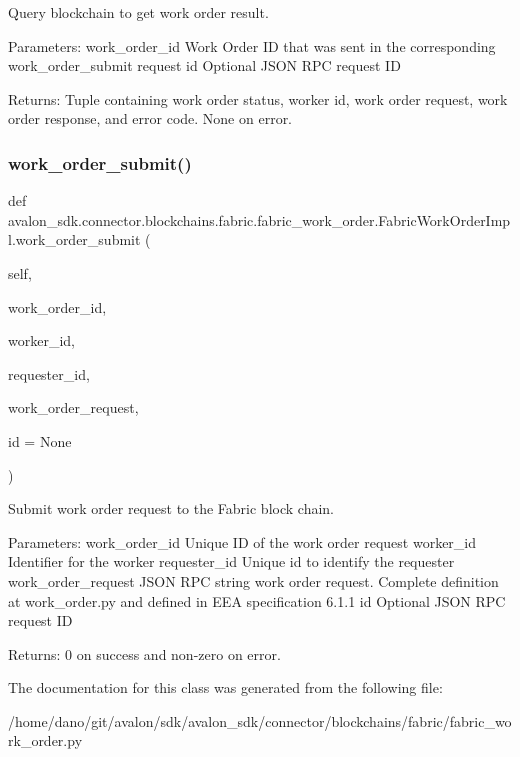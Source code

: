 \begin{DoxyVerb}Query blockchain to get work order result.

Parameters:
work_order_id Work Order ID that was sent in the
      corresponding work_order_submit request
id            Optional JSON RPC request ID

Returns:
Tuple containing work order status, worker id, work order request,
work order response, and error code.
None on error.
\end{DoxyVerb}
 \mbox{\label{classavalon__sdk_1_1connector_1_1blockchains_1_1fabric_1_1fabric__work__order_1_1FabricWorkOrderImpl_afa47ca30496161f6fe0c60481fd417ee}} 
\subsubsection{\texorpdfstring{work\+\_\+order\+\_\+submit()}{work\_order\_submit()}}
{\footnotesize\ttfamily def avalon\+\_\+sdk.\+connector.\+blockchains.\+fabric.\+fabric\+\_\+work\+\_\+order.\+Fabric\+Work\+Order\+Impl.\+work\+\_\+order\+\_\+submit (\begin{DoxyParamCaption}\item[{}]{self,  }\item[{}]{work\+\_\+order\+\_\+id,  }\item[{}]{worker\+\_\+id,  }\item[{}]{requester\+\_\+id,  }\item[{}]{work\+\_\+order\+\_\+request,  }\item[{}]{id = {\ttfamily None} }\end{DoxyParamCaption})}

\begin{DoxyVerb}Submit work order request to the Fabric block chain.

Parameters:
work_order_id      Unique ID of the work order request
worker_id          Identifier for the worker
requester_id       Unique id to identify the requester
work_order_request JSON RPC string work order request.
           Complete definition at work_order.py and
           defined in EEA specification 6.1.1
id                 Optional JSON RPC request ID

Returns:
0 on success and non-zero on error.
\end{DoxyVerb}
 

The documentation for this class was generated from the following file\+:\begin{DoxyCompactItemize}
\item 
/home/dano/git/avalon/sdk/avalon\+\_\+sdk/connector/blockchains/fabric/fabric\+\_\+work\+\_\+order.\+py\end{DoxyCompactItemize}
